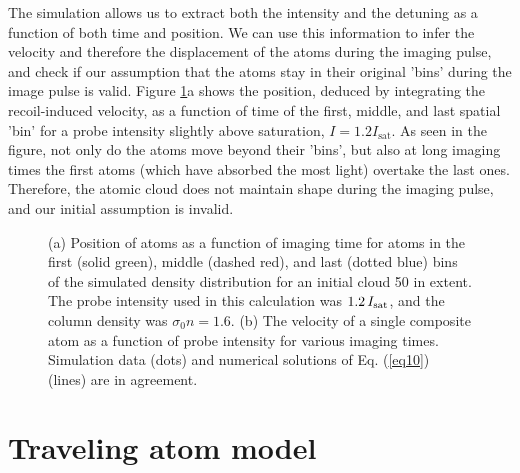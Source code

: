 The simulation allows us to extract both the intensity and the detuning as a function of both time and position. We can use this information to infer the velocity and therefore the displacement of the atoms during the imaging pulse, and check if our assumption that the atoms stay in their original 'bins' during the image pulse is valid. Figure \ref{fig:simTests}a shows the position, deduced by integrating the recoil-induced velocity, as a function of time of the first, middle, and last spatial 'bin' for a probe intensity slightly above saturation, $I = 1.2 I_{\mathrm{sat}}$. As seen in the figure, not only do the atoms move beyond their 'bins', but also at long imaging times the first atoms (which have absorbed the most light) overtake the last ones. Therefore, the atomic cloud does not maintain shape during the imaging pulse, and our initial assumption is invalid.  

\begin{figure}
\caption{(a) Position of atoms as a function of imaging time for atoms in the first (solid green), middle (dashed red), and last (dotted blue) bins of the simulated density distribution for an initial cloud 50 \um{} in extent. The probe intensity used in this calculation was $1.2\, I_{\rm{sat}}$, and the column density was $\sigma_0 n=1.6$. (b) The velocity of a single composite atom as a function of probe intensity for various imaging times. Simulation data (dots) and numerical  solutions of Eq. (\ref{eq10}) (lines) are in agreement.}
\label{fig:simTests}
\end{figure}	

%


\section{Traveling atom model}

